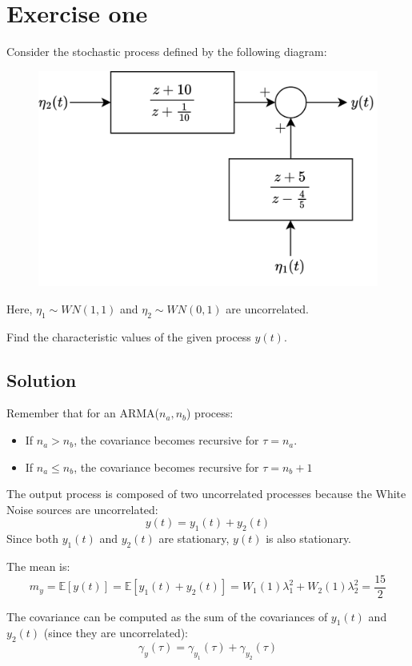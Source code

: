 \section{Exercise one}

Consider the stochastic process defined by the following diagram:
\begin{figure}[H]
    \centering
    \includegraphics[width=0.5\linewidth]{images/block.png}
\end{figure}
Here, $\eta_1 \sim WN(1,1)$ and $\eta_2 \sim WN(0,1)$ are uncorrelated. 

Find the characteristic values of the given process $y(t)$.

\subsection*{Solution}
Remember that for an ARMA($n_a,n_b$) process:
\begin{itemize}
    \item If $n_a>n_b$, the covariance becomes recursive for $\tau=n_a$.
    \item If $n_a \leq n_b$, the covariance becomes recursive for $\tau=n_b+1$
\end{itemize}

The output process is composed of two uncorrelated processes because the White Noise sources are uncorrelated:
\[y(t)=y_1(t)+y_2(t)\]
Since both $y_1(t)$ and $y_2(t)$ are stationary, $y(t)$ is also stationary.

The mean is: 
\[m_y=\mathbb{E}\left[y(t)\right]=\mathbb{E}\left[y_1(t)+y_2(t)\right]=W_1(1)\lambda_1^2+W_2(1)\lambda_2^2=\dfrac{15}{2}\]

The covariance can be computed as the sum of the covariances of $y_1(t)$ and $y_2(t)$ (since they are uncorrelated):
\[\gamma_y(\tau)=\gamma_{y_1}(\tau)+\gamma_{y_2}(\tau)\]

